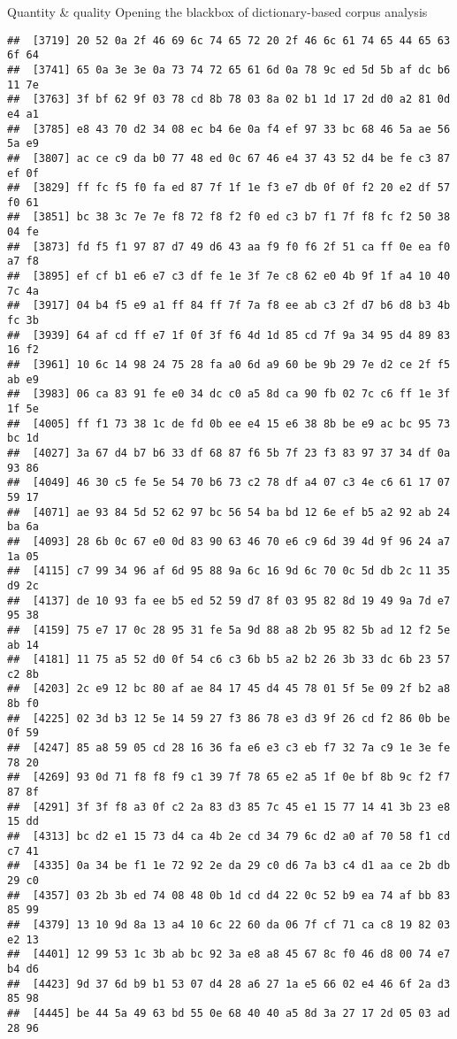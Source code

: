 \documentclass[
  ignorenonframetext,
]{beamer}
\begin{document}
\begin{frame}[fragile]{Quantity \& quality \textbar{} Opening the
blackbox of dictionary-based corpus analysis}
\begin{verbatim}
##  [3719] 20 52 0a 2f 46 69 6c 74 65 72 20 2f 46 6c 61 74 65 44 65 63 6f 64
##  [3741] 65 0a 3e 3e 0a 73 74 72 65 61 6d 0a 78 9c ed 5d 5b af dc b6 11 7e
##  [3763] 3f bf 62 9f 03 78 cd 8b 78 03 8a 02 b1 1d 17 2d d0 a2 81 0d e4 a1
##  [3785] e8 43 70 d2 34 08 ec b4 6e 0a f4 ef 97 33 bc 68 46 5a ae 56 5a e9
##  [3807] ac ce c9 da b0 77 48 ed 0c 67 46 e4 37 43 52 d4 be fe c3 87 ef 0f
##  [3829] ff fc f5 f0 fa ed 87 7f 1f 1e f3 e7 db 0f 0f f2 20 e2 df 57 f0 61
##  [3851] bc 38 3c 7e 7e f8 72 f8 f2 f0 ed c3 b7 f1 7f f8 fc f2 50 38 04 fe
##  [3873] fd f5 f1 97 87 d7 49 d6 43 aa f9 f0 f6 2f 51 ca ff 0e ea f0 a7 f8
##  [3895] ef cf b1 e6 e7 c3 df fe 1e 3f 7e c8 62 e0 4b 9f 1f a4 10 40 7c 4a
##  [3917] 04 b4 f5 e9 a1 ff 84 ff 7f 7a f8 ee ab c3 2f d7 b6 d8 b3 4b fc 3b
##  [3939] 64 af cd ff e7 1f 0f 3f f6 4d 1d 85 cd 7f 9a 34 95 d4 89 83 16 f2
##  [3961] 10 6c 14 98 24 75 28 fa a0 6d a9 60 be 9b 29 7e d2 ce 2f f5 ab e9
##  [3983] 06 ca 83 91 fe e0 34 dc c0 a5 8d ca 90 fb 02 7c c6 ff 1e 3f 1f 5e
##  [4005] ff f1 73 38 1c de fd 0b ee e4 15 e6 38 8b be e9 ac bc 95 73 bc 1d
##  [4027] 3a 67 d4 b7 b6 33 df 68 87 f6 5b 7f 23 f3 83 97 37 34 df 0a 93 86
##  [4049] 46 30 c5 fe 5e 54 70 b6 73 c2 78 df a4 07 c3 4e c6 61 17 07 59 17
##  [4071] ae 93 84 5d 52 62 97 bc 56 54 ba bd 12 6e ef b5 a2 92 ab 24 ba 6a
##  [4093] 28 6b 0c 67 e0 0d 83 90 63 46 70 e6 c9 6d 39 4d 9f 96 24 a7 1a 05
##  [4115] c7 99 34 96 af 6d 95 88 9a 6c 16 9d 6c 70 0c 5d db 2c 11 35 d9 2c
##  [4137] de 10 93 fa ee b5 ed 52 59 d7 8f 03 95 82 8d 19 49 9a 7d e7 95 38
##  [4159] 75 e7 17 0c 28 95 31 fe 5a 9d 88 a8 2b 95 82 5b ad 12 f2 5e ab 14
##  [4181] 11 75 a5 52 d0 0f 54 c6 c3 6b b5 a2 b2 26 3b 33 dc 6b 23 57 c2 8b
##  [4203] 2c e9 12 bc 80 af ae 84 17 45 d4 45 78 01 5f 5e 09 2f b2 a8 8b f0
##  [4225] 02 3d b3 12 5e 14 59 27 f3 86 78 e3 d3 9f 26 cd f2 86 0b be 0f 59
##  [4247] 85 a8 59 05 cd 28 16 36 fa e6 e3 c3 eb f7 32 7a c9 1e 3e fe 78 20
##  [4269] 93 0d 71 f8 f8 f9 c1 39 7f 78 65 e2 a5 1f 0e bf 8b 9c f2 f7 87 8f
##  [4291] 3f 3f f8 a3 0f c2 2a 83 d3 85 7c 45 e1 15 77 14 41 3b 23 e8 15 dd
##  [4313] bc d2 e1 15 73 d4 ca 4b 2e cd 34 79 6c d2 a0 af 70 58 f1 cd c7 41
##  [4335] 0a 34 be f1 1e 72 92 2e da 29 c0 d6 7a b3 c4 d1 aa ce 2b db 29 c0
##  [4357] 03 2b 3b ed 74 08 48 0b 1d cd d4 22 0c 52 b9 ea 74 af bb 83 85 99
##  [4379] 13 10 9d 8a 13 a4 10 6c 22 60 da 06 7f cf 71 ca c8 19 82 03 e2 13
##  [4401] 12 99 53 1c 3b ab bc 92 3a e8 a8 45 67 8c f0 46 d8 00 74 e7 b4 d6
##  [4423] 9d 37 6d b9 b1 53 07 d4 28 a6 27 1a e5 66 02 e4 46 6f 2a d3 85 98
##  [4445] be 44 5a 49 63 bd 55 0e 68 40 40 a5 8d 3a 27 17 2d 05 03 ad 28 96

\end{verbatim}
\end{frame}
\end{document}
